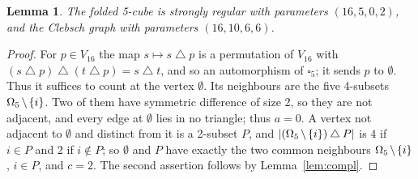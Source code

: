 \documentclass[11pt]{amsart}
\newcommand\diff{\mathbin{\mkern-1.5mu\setminus\mkern-1.5mu}}%
\newtheorem{lemma}[theorem]{Lemma}
\theoremstyle{definition}
\newcommand{\sd}{\mathbin{\triangle}}
\begin{document}
\begin{lemma}\label{lem:fold-param}
The folded 5-cube is strongly regular with parameters $(16,5,0,2)$, and the Clebsch graph with
parameters $(16,10,6,6)$.
\end{lemma}

\begin{proof}
For $p\in V_{16}$ the map $s\mapsto s\sd p$ is a permutation of $V_{16}$ with $(s\sd p)\sd(t\sd
p)=s\sd t$, and so an automorphism of $\square_5$; it sends $p$ to $\emptyset$. Thus it suffices to
count at the vertex $\emptyset$. Its neighbours are the five 4-subsets $\Omega_5\diff\{i\}$. Two of
them have symmetric difference of size 2, so they are not adjacent, and every edge at $\emptyset$
lies in no triangle; thus $a=0$. A vertex not adjacent to $\emptyset$ and distinct from it is a
2-subset $P$, and $\lvert(\Omega_5\diff\{i\})\sd P\rvert$ is $4$ if $i\in P$ and $2$ if
$i\notin P$; so $\emptyset$ and $P$ have exactly the two common neighbours $\Omega_5\diff\{i\}$,
$i\in P$, and $c=2$. The second assertion follows by Lemma~\ref{lem:compl}.
\end{proof}
\end{document}

